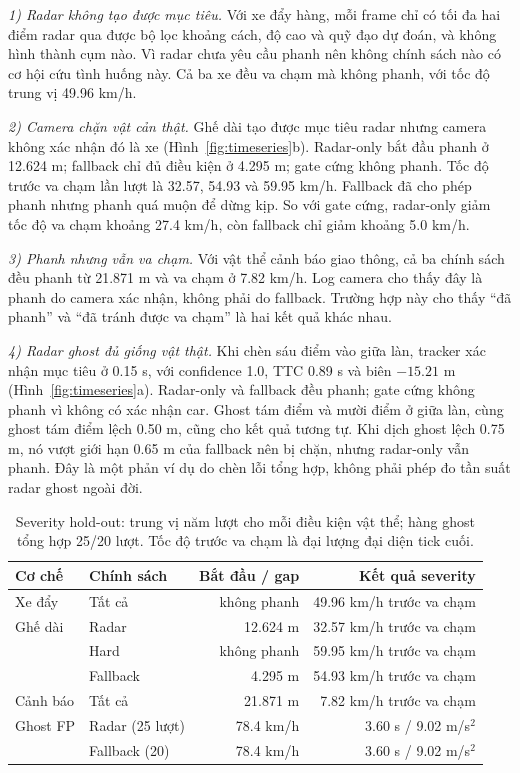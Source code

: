 \documentclass[conference]{IEEEtran}
\begin{document}
\emph{1) Radar không tạo được mục tiêu.} Với xe đẩy hàng, mỗi frame chỉ có tối
đa hai điểm radar qua được bộ lọc khoảng cách, độ cao và quỹ đạo dự đoán, và
không hình thành cụm nào. Vì radar chưa yêu cầu phanh nên
không chính sách nào có cơ hội cứu tình huống này. Cả ba xe đều va chạm mà
không phanh, với tốc độ trung vị 49.96 km/h.

\emph{2) Camera chặn vật cản thật.} Ghế dài tạo được mục tiêu radar nhưng
camera không xác nhận đó là xe (Hình~\ref{fig:timeseries}b). Radar-only bắt đầu phanh ở 12.624 m; fallback
chỉ đủ điều kiện ở 4.295 m; gate cứng không phanh. Tốc độ trước va chạm lần
lượt là 32.57, 54.93 và 59.95 km/h. Fallback đã cho phép phanh nhưng phanh
quá muộn để dừng kịp. So với gate cứng, radar-only giảm tốc độ va chạm khoảng
27.4 km/h, còn fallback chỉ giảm khoảng 5.0 km/h.

\emph{3) Phanh nhưng vẫn va chạm.} Với vật thể cảnh báo giao thông, cả ba
chính sách đều phanh từ 21.871 m và va chạm ở 7.82 km/h. Log camera cho thấy
đây là phanh do camera xác nhận, không phải do fallback. Trường hợp này cho
thấy ``đã phanh'' và ``đã tránh được va chạm'' là hai kết quả khác nhau.

\emph{4) Radar ghost đủ giống vật thật.} Khi chèn sáu điểm vào giữa làn,
tracker xác nhận mục tiêu ở 0.15 s, với confidence 1.0, TTC 0.89 s và biên
$-15.21$ m (Hình~\ref{fig:timeseries}a). Radar-only và fallback đều phanh; gate cứng không phanh vì không
có xác nhận car. Ghost tám điểm và mười điểm ở giữa làn, cùng ghost tám điểm
lệch 0.50 m, cũng cho kết quả tương tự. Khi
dịch ghost lệch 0.75 m, nó vượt giới hạn 0.65 m của fallback nên bị chặn,
nhưng radar-only vẫn phanh. Đây là một phản ví dụ do chèn lỗi tổng hợp, không
phải phép đo tần suất radar ghost ngoài đời.

\begin{table}[t]
\caption{Severity hold-out: trung vị năm lượt cho mỗi điều kiện vật thể; hàng ghost tổng hợp 25/20 lượt. Tốc độ trước va chạm là đại lượng đại diện tick cuối.}
\label{tab:severity}
\centering\scriptsize
\setlength{\tabcolsep}{3pt}
\begin{tabular}{llrr}
\toprule Cơ chế & Chính sách & Bắt đầu / gap & Kết quả severity\\ \midrule
Xe đẩy & Tất cả & không phanh & 49.96 km/h trước va chạm\\
Ghế dài & Radar & 12.624 m & 32.57 km/h trước va chạm\\
 & Hard & không phanh & 59.95 km/h trước va chạm\\
 & Fallback & 4.295 m & 54.93 km/h trước va chạm\\
Cảnh báo & Tất cả & 21.871 m & 7.82 km/h trước va chạm\\
\midrule
Ghost FP & Radar (25 lượt) & 78.4 km/h & 3.60 s / 9.02 m/s$^2$\\
 & Fallback (20) & 78.4 km/h & 3.60 s / 9.02 m/s$^2$\\
\bottomrule
\end{tabular}
\end{table}
\end{document}
